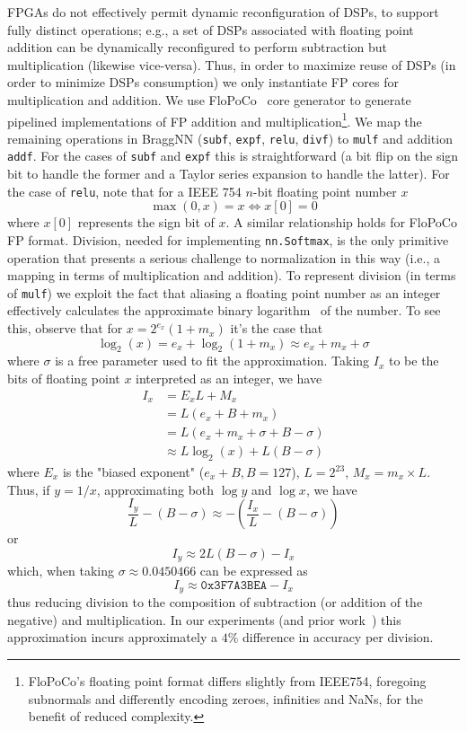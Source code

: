 FPGAs do not effectively permit dynamic reconfiguration of DSPs, to support fully distinct operations; e.g., a set of DSPs associated with floating point addition can be dynamically reconfigured to perform subtraction but multiplication (likewise vice-versa).
Thus, in order to maximize reuse of DSPs (in order to minimize DSPs consumption) we only instantiate FP cores for multiplication and addition.
We use FloPoCo~\cite{8877424} core generator to generate pipelined implementations of FP addition and multiplication\footnote{FloPoCo's floating point format differs slightly from IEEE754, foregoing subnormals and differently encoding zeroes, infinities and NaNs, for the benefit of reduced complexity.}.
We map the remaining operations in BraggNN (\texttt{subf}, \texttt{expf}, \texttt{relu}, \texttt{divf}) to \texttt{mulf} and addition \texttt{addf}.
For the cases of \texttt{subf} and \texttt{expf} this is straightforward (a bit flip on the sign bit to handle the former and a Taylor series expansion to handle the latter).
For the case of \texttt{relu}, note that for a IEEE 754 $n$-bit floating point number $x$
$$
\max(0, x) = x \iff x[0] = 0
$$
where $x[0]$ represents the sign bit of $x$.
A similar relationship holds for FloPoCo FP format.
Division, needed for implementing \texttt{nn.Softmax}, is the only primitive operation that presents a serious challenge to normalization in this way (i.e., a mapping in terms of multiplication and addition).
To represent division (in terms of \texttt{mulf}) we exploit the fact that aliasing a floating point number as an integer effectively calculates the approximate binary logarithm~\cite{enwiki:1081681080} of the number.
To see this, observe that for $x=2^{e_{x}}(1+m_{x})$ it's the case that
\[
	\log _{2}(x)=e_{x}+\log _{2}(1+m_{x})	\approx e_{x} + m_x + \sigma
\]
where $\sigma$ is a free parameter used to fit the approximation.
Taking $I_x$ to be the bits of floating point $x$ interpreted as an integer, we have 
\[
\begin{aligned}
	I_{x}&=E_{x}L+M_{x}\\
	&=L(e_{x}+B+m_{x})\\
	&=L(e_{x}+m_{x}+\sigma +B-\sigma )\\
	&\approx L\log _{2}(x)+L(B-\sigma )
\end{aligned}
\]
where $E_{x}$ is the "biased exponent" ($e_x + B, B = 127$), $L = 2^{23}$, $M_{x}=m_{x}\times L$.
Thus, if $y = 1/x$, approximating both $\log y$ and $\log x$, we have 
\[
	{\frac {I_{y}}{L}}-(B-\sigma )\approx -\left({\frac {I_{x}}{L}}-(B-\sigma )\right)	
\]
or
\[
	I_{y}\approx 2 L(B-\sigma ) - I_{x}
\]
which, when taking $\sigma \approx 0.0450466$ can be expressed as 
\[
	I_y \approx \texttt{0x3F7A3BEA} - I_x
\]
thus reducing division to the composition of subtraction (or addition of the negative) and multiplication.
In our experiments (and prior work~\cite{10.1007/978-0-387-72258-0_14}) this approximation incurs approximately a $4\%$ difference in accuracy per division.

